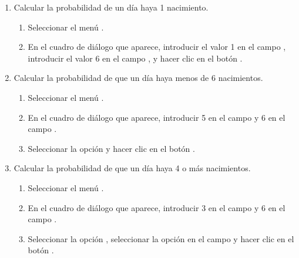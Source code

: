 \begin{enumerate}[leftmargin=*]
\begin{enumerate}
\item Calcular la probabilidad de un día haya 1 nacimiento.
\begin{indicacion}{
\begin{enumerate}
\item Seleccionar el menú .
\item En el cuadro de diálogo que aparece, introducir el valor 1 en el campo , introducir
el valor 6 en el campo , y hacer clic en el botón .
\end{enumerate}}
\end{indicacion}

\item Calcular la probabilidad de que un día haya menos de 6 nacimientos.
\begin{indicacion}{
\begin{enumerate}
\item Seleccionar el menú .
\item En el cuadro de diálogo que aparece, introducir 5 en el campo  y 6 en el campo
.
\item Seleccionar la opción  y hacer clic en el botón .
\end{enumerate}}
\end{indicacion}

\item Calcular la probabilidad de que un día haya 4 o más nacimientos. 
\begin{indicacion}{
\begin{enumerate}
\item Seleccionar el menú .
\item En el cuadro de diálogo que aparece, introducir 3 en el campo  y 6 en el campo
. 
\item Seleccionar la opción , seleccionar la opción  en el campo
 y hacer clic en el botón .
\end{enumerate}}
\end{indicacion}


\end{enumerate}
\end{enumerate}
